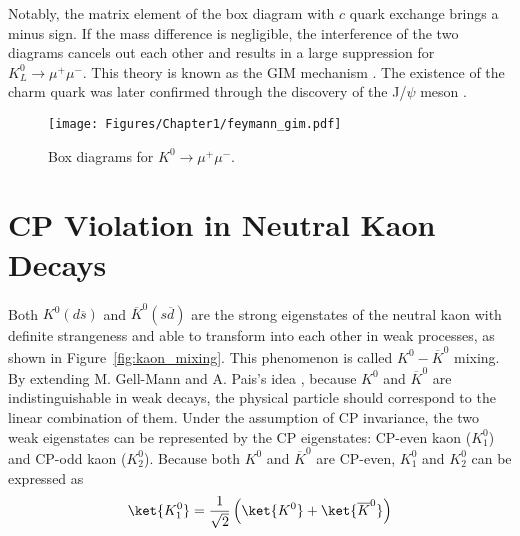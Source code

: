 \vspace{0.5em}
Notably, the matrix element of the box diagram with $c$ quark exchange brings a minus sign. If the mass difference is negligible, the interference of the two diagrams cancels out each other and results in a large suppression for ${K_L^0 \to \mu^+ \mu^-}$. This theory is known as the GIM mechanism \parencite{GIM}. The existence of the charm quark was later confirmed through the discovery of the J/$\psi$ meson \parencite{charm_SLAC, charm_BNL}.

\begin{figure}[h]
\begin{center}
\captionsetup{width=.99\linewidth}
\texttt{[image: Figures/Chapter1/feymann\_gim.pdf]}
\caption{Box diagrams for $K^0\to\mu^+\mu^-$.}
\label{fig:gim}
\end{center}
\end{figure}



\section{CP Violation in Neutral Kaon Decays}
\label{sec:neutral_K}

 
 
Both ${K^0(d \overline{s})}$ and ${\overline{K}^0(s \overline{d})}$ are the strong eigenstates of the neutral kaon with definite strangeness and able to transform into each other in weak processes, as shown in Figure~\ref{fig:kaon_mixing}. This phenomenon is called $K^0-\overline{K}^0$ mixing. By extending M. Gell-Mann and A. Pais's idea \parencite{kaon_CP_behavior}, because $K^0$ and $\overline{K}^0$ are indistinguishable in weak decays, the physical particle should correspond to the linear combination of them. Under the assumption of CP invariance, the two weak eigenstates can be represented by the CP eigenstates: CP-even kaon ($K_1^0$) and CP-odd kaon ($K_2^0$). Because both $K^0$ and $\overline{K}^0$ are CP-even, $K_1^0$ and $K_2^0$ can be expressed as 
%
\begin{align}
\ket{K_1^0} = \frac{1}{\sqrt{2}} \left( \ket{K^0} + \ket{\overline{K}^0}\right) 
\end{align}

